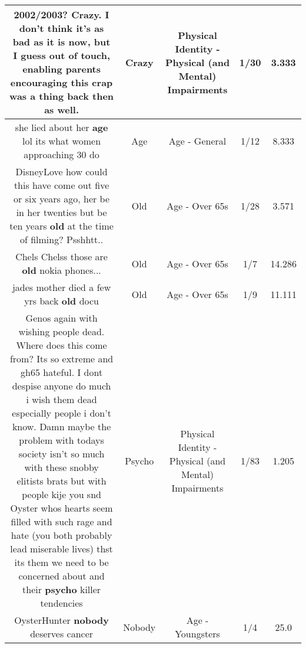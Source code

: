 \documentclass[11pt]{article}
\newlength\mylength
\begin{document}
\begin{center}
\begin{longtable}{|C{.65\mylength}|C{.30\mylength}|C{.12\mylength}|C{.12\mylength}|C{.12\mylength}|}
  \small 2002/2003? \textbf{Crazy}. I don't think it's as bad as it is now, but I guess out of touch, enabling parents encouraging this crap was a thing back then as well.\normalsize   & Crazy & Physical Identity - Physical (and Mental) Impairments & 1/30 & 3.333 \\  \hline
  \small she lied about her \textbf{age} lol its what women approaching 30 do\normalsize   & Age & Age - General & 1/12 & 8.333 \\  \hline
  \small DisneyLove how could this have come out five or six years ago, her be in her twenties but be ten years \textbf{old} at the time of filming? Psshhtt..\normalsize   & Old & Age - Over 65s & 1/28 & 3.571 \\  \hline
  \small Chels Chelss those are \textbf{old} nokia phones...\normalsize   & Old & Age - Over 65s & 1/7 & 14.286 \\  \hline
  \small jades mother died a few yrs back \textbf{old} docu\normalsize   & Old & Age - Over 65s & 1/9 & 11.111 \\  \hline
  \small Genos again with wishing people dead. Where does this come from? Its so extreme and gh65 hateful. I dont despise anyone do much i wish them dead especially people i don't know. Damn maybe the  problem with todays society isn't so much with these snobby elitists brats but with people kije you snd Oyster whos hearts seem filled with such rage and hate (you both probably lead miserable lives) thst its them we need to be concerned about and their \textbf{psycho} killer tendencies\normalsize   & Psycho & Physical Identity - Physical (and Mental) Impairments & 1/83 & 1.205 \\  \hline
  \small OysterHunter \textbf{nobody} deserves cancer\normalsize   & Nobody & Age - Youngsters & 1/4 & 25.0 \\  \hline

\end{longtable}
\end{center}
\end{document}
